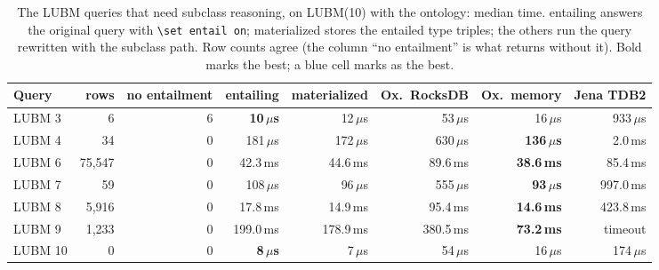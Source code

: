 \begin{table}[t]
\caption{The LUBM queries that need subclass reasoning, on LUBM(10) with the ontology: median time. \sys{} entailing answers the original query with \texttt{\textbackslash set entail on}; \sys{} materialized stores the entailed type triples; the others run the query rewritten with the subclass path. Row counts agree (the column ``no entailment'' is what \sys{} returns without it). Bold marks the best; a blue cell marks \sys{} as the best.}
\label{tab-entail}
\small
\begin{tabular}{@{}lrrrrrrr@{}}
\toprule
Query & rows & no entailment & \sys{} entailing & \sys{} materialized & Ox.\ RocksDB & Ox.\ memory & Jena TDB2 \\
\midrule
LUBM 3 & 6 & 6 & \cellcolor{ours}\textbf{10\,$\mu$s} & 12\,$\mu$s & 53\,$\mu$s & 16\,$\mu$s & 933\,$\mu$s \\
LUBM 4 & 34 & 0 & 181\,$\mu$s & 172\,$\mu$s & 630\,$\mu$s & \textbf{136\,$\mu$s} & 2.0\,ms \\
LUBM 6 & 75,547 & 0 & 42.3\,ms & 44.6\,ms & 89.6\,ms & \textbf{38.6\,ms} & 85.4\,ms \\
LUBM 7 & 59 & 0 & 108\,$\mu$s & 96\,$\mu$s & 555\,$\mu$s & \textbf{93\,$\mu$s} & 997.0\,ms \\
LUBM 8 & 5,916 & 0 & 17.8\,ms & 14.9\,ms & 95.4\,ms & \textbf{14.6\,ms} & 423.8\,ms \\
LUBM 9 & 1,233 & 0 & 199.0\,ms & 178.9\,ms & 380.5\,ms & \textbf{73.2\,ms} & timeout \\
LUBM 10 & 0 & 0 & \cellcolor{ours}\textbf{8\,$\mu$s} & 7\,$\mu$s & 54\,$\mu$s & 16\,$\mu$s & 174\,$\mu$s \\
\bottomrule
\end{tabular}
\end{table}
